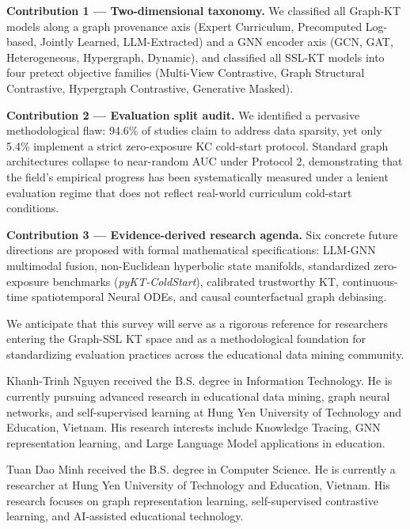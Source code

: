 \documentclass[journal]{IEEEtran}
\begin{document}
\textbf{Contribution 1 --- Two-dimensional taxonomy.} We classified all Graph-KT models along a graph provenance axis (Expert Curriculum, Precomputed Log-based, Jointly Learned, LLM-Extracted) and a GNN encoder axis (GCN, GAT, Heterogeneous, Hypergraph, Dynamic), and classified all SSL-KT models into four pretext objective families (Multi-View Contrastive, Graph Structural Contrastive, Hypergraph Contrastive, Generative Masked).

\textbf{Contribution 2 --- Evaluation split audit.} We identified a pervasive methodological flaw: 94.6\% of studies claim to address data sparsity, yet only 5.4\% implement a strict zero-exposure KC cold-start protocol. Standard graph architectures collapse to near-random AUC under Protocol 2, demonstrating that the field's empirical progress has been systematically measured under a lenient evaluation regime that does not reflect real-world curriculum cold-start conditions.

\textbf{Contribution 3 --- Evidence-derived research agenda.} Six concrete future directions are proposed with formal mathematical specifications: LLM-GNN multimodal fusion, non-Euclidean hyperbolic state manifolds, standardized zero-exposure benchmarks (\textit{pyKT-ColdStart}), calibrated trustworthy KT, continuous-time spatiotemporal Neural ODEs, and causal counterfactual graph debiasing.

We anticipate that this survey will serve as a rigorous reference for researchers entering the Graph-SSL KT space and as a methodological foundation for standardizing evaluation practices across the educational data mining community.




\begin{IEEEbiographynophoto}{Khanh-Trinh Nguyen}
received the B.S. degree in Information Technology. He is currently pursuing advanced research in educational data mining, graph neural networks, and self-supervised learning at Hung Yen University of Technology and Education, Vietnam. His research interests include Knowledge Tracing, GNN representation learning, and Large Language Model applications in education.
\end{IEEEbiographynophoto}

\begin{IEEEbiographynophoto}{Tuan Dao Minh}
received the B.S. degree in Computer Science. He is currently a researcher at Hung Yen University of Technology and Education, Vietnam. His research focuses on graph representation learning, self-supervised contrastive learning, and AI-assisted educational technology.
\end{IEEEbiographynophoto}
\end{document}
